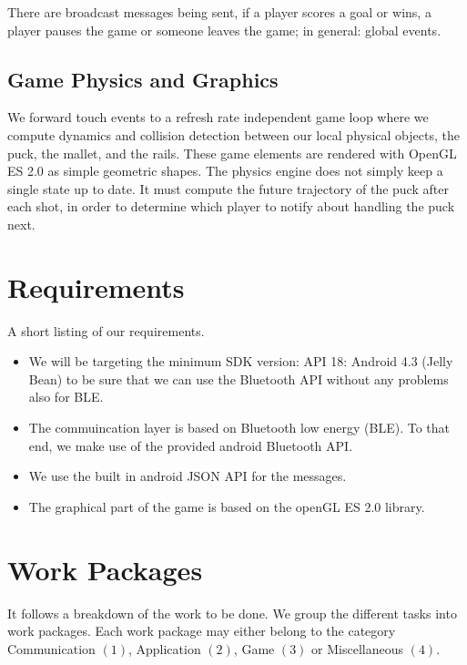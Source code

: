 \documentclass{report}
\begin{document}
There are broadcast messages being sent, if a player scores a goal or wins, a player pauses the game or someone leaves the game; in general: global events.

\subsection{Game Physics and Graphics} We forward touch events to a refresh rate independent game loop where we compute dynamics and collision detection between our local physical objects, the puck, the mallet, and the rails. These game elements are rendered with OpenGL ES 2.0 as simple geometric shapes. The physics engine does not simply keep a single state up to date. It must compute the future trajectory of the puck after each shot, in order to determine which player to notify about handling the puck next.

\section{Requirements}
A short listing of our requirements.

\begin{itemize}
        \item We will be targeting the minimum SDK version: API 18: Android 4.3 (Jelly Bean) to be sure that we can use the Bluetooth API without any problems also for BLE.
        \item The commuincation layer is based on Bluetooth low energy (BLE). To that end, we make use of the provided android Bluetooth API.
        \item We use the built in android JSON API for the messages.
        \item The graphical part of the game is based on the openGL ES 2.0 library.
\end{itemize}

\section{Work Packages}
It follows a breakdown of the work to be done. We group the different tasks into work packages. Each work package may either belong to the category Communication $(1)$, Application $(2)$, Game $(3)$ or Miscellaneous $(4)$.
\end{document}
